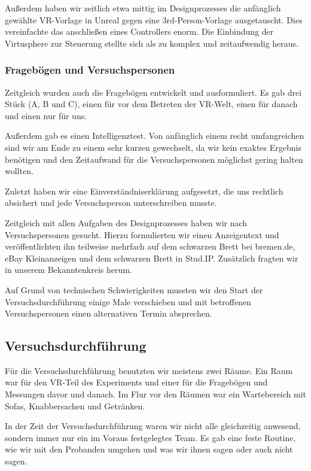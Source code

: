 \documentclass{Bericht}
\begin{document}
			Außerdem haben wir zeitlich etwa mittig im Designprozesses die anfänglich gewählte VR-Vorlage in Unreal gegen eine 3rd-Person-Vorlage ausgetauscht. Dies vereinfachte das anschließen eines Controllers enorm. Die Einbindung der Virtusphere zur Steuerung stellte sich als zu komplex und zeitaufwendig heraus. 
		
		\subsubsection{Fragebögen und Versuchspersonen}
			Zeitgleich wurden auch die Fragebögen entwickelt und ausformuliert. Es gab drei Stück (A, B und C), einen für vor dem Betreten der VR-Welt, einen für danach und einen nur für uns.
			
			Außerdem gab es einen Intelligenztest. Von anfänglich einem recht umfangreichen sind wir am Ende zu einem sehr kurzen gewechselt, da wir kein exaktes Ergebnis benötigen und den Zeitaufwand für die Versuchspersonen möglichst gering halten wollten.
			
			Zuletzt haben wir eine Einverständniserklärung aufgesetzt, die uns rechtlich absichert und jede Versuchsperson unterschreiben musste.
			
			Zeitgleich mit allen Aufgaben des Designprozesses haben wir nach Versuchspersonen gesucht. Hierzu formulierten wir einen Anzeigentext und veröffentlichten ihn teilweise mehrfach auf dem schwarzen Brett bei bremen.de, eBay Kleinanzeigen und dem schwarzen Brett in Stud.IP. Zusätzlich fragten wir in unserem Bekanntenkreis herum. 
			
			Auf Grund von technischen Schwierigkeiten mussten wir den Start der Versuchsdurchführung einige Male verschieben und mit betroffenen Versuchspersonen einen alternativen Termin absprechen. 
		
	\subsection{Versuchsdurchführung} %
		Für die Versuchsdurchführung benutzten wir meistens zwei Räume. Ein Raum war für den VR-Teil des Experiments und einer für die Fragebögen und Messungen davor und danach. Im Flur vor den Räumen war ein Wartebereich mit Sofas, Knabbersachen und Getränken. 
		
		In der Zeit der Versuchsdurchführung waren wir nicht alle gleichzeitig anwesend, sondern immer nur ein im Voraus festgelegtes Team. Es gab eine feste Routine, wie wir mit den Probanden umgehen und was wir ihnen sagen oder auch nicht sagen. 
		
\end{document}

